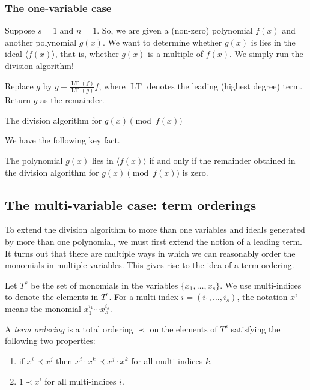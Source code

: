 \documentclass[11pt]{article}
\DeclareMathOperator{\LT}{LT}
\begin{document}
\subsubsection{The one-variable case}
Suppose $s = 1$ and $n = 1$.
So, we are given a (non-zero) polynomial $f(x)$ and another polynomial $g(x)$.
We want to determine whether $g(x)$ is lies in the ideal $\langle  f(x) \rangle$, that is, whether $g(x)$ is a multiple of $f(x)$.
We simply run the division algorithm!

\begin{algorithm}
  {
    Replace $g$ by $g - \frac{\LT(f)}{\LT(g)} f$, where $\LT$ denotes the leading (highest degree) term.
  }
  Return $g$ as the remainder.
  \bigskip

  \caption{The division algorithm for $g(x) \pmod {f(x)}$}
\end{algorithm}

We have the following key fact.
\begin{proposition}
  The polynomial $g(x)$ lies in $\langle  f(x) \rangle$ if and only if the remainder obtained in the division algorithm for $g(x) \pmod {f(x)}$ is zero.
\end{proposition}

\subsection{The multi-variable case: term orderings}
To extend the division algorithm to more than one variables and ideals generated by more than one polynomial, we must first extend the notion of a leading term.
It turns out that there are multiple ways in which we can reasonably order the monomials in multiple variables.
This gives rise to the idea of a term ordering.

Let $T^s$ be the set of monomials in the variables $\{x_1, \dots, x_s\}$.
We use multi-indices to denote the elements in $T^s$.
For a multi-index $i = (i_1, \dots, i_s)$, the notation $x^i$ means the monomial $x_1^{i_1} \cdots x_s^{i_s}$.
\begin{definition}
  A \emph{term ordering} is a total ordering $\prec$ on the elements of $T^s$ satisfying the following two properties:
  \begin{enumerate}
  \item if $x^i \prec x^j$ then $x^i \cdot x^k \prec x^j \cdot x^k$ for all multi-indices $k$.
  \item $1 \prec x^i$ for all multi-indices $i$.
  \end{enumerate}
\end{definition}
\end{document}
